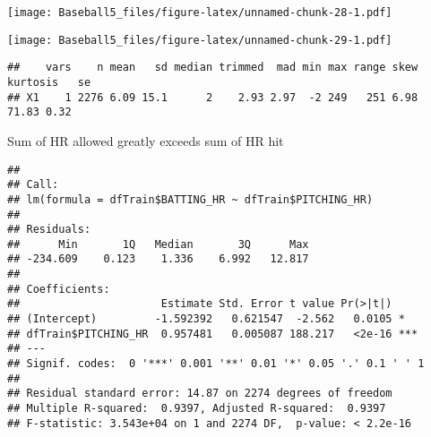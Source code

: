 \documentclass[
]{article}
\newenvironment{Shaded}{\begin{snugshade}}{\end{snugshade}}
\newcommand{\AttributeTok}[1]{\textcolor[rgb]{0.77,0.63,0.00}{#1}}
\newcommand{\DecValTok}[1]{\textcolor[rgb]{0.00,0.00,0.81}{#1}}
\newcommand{\FunctionTok}[1]{\textcolor[rgb]{0.00,0.00,0.00}{#1}}
\newcommand{\NormalTok}[1]{#1}
\newcommand{\OtherTok}[1]{\textcolor[rgb]{0.56,0.35,0.01}{#1}}
\newcommand{\SpecialCharTok}[1]{\textcolor[rgb]{0.00,0.00,0.00}{#1}}
\begin{document}
\texttt{[image: Baseball5\_files/figure-latex/unnamed-chunk-28-1.pdf]}

\begin{Shaded}
\end{Shaded}

\texttt{[image: Baseball5\_files/figure-latex/unnamed-chunk-29-1.pdf]}

\begin{Shaded}
\end{Shaded}

\begin{verbatim}
##    vars    n mean   sd median trimmed  mad min max range skew kurtosis   se
## X1    1 2276 6.09 15.1      2    2.93 2.97  -2 249   251 6.98    71.83 0.32
\end{verbatim}

Sum of HR allowed greatly exceeds sum of HR hit

\begin{Shaded}
\end{Shaded}

\begin{verbatim}
## 
## Call:
## lm(formula = dfTrain$BATTING_HR ~ dfTrain$PITCHING_HR)
## 
## Residuals:
##      Min       1Q   Median       3Q      Max 
## -234.609    0.123    1.336    6.992   12.817 
## 
## Coefficients:
##                      Estimate Std. Error t value Pr(>|t|)    
## (Intercept)         -1.592392   0.621547  -2.562   0.0105 *  
## dfTrain$PITCHING_HR  0.957481   0.005087 188.217   <2e-16 ***
## ---
## Signif. codes:  0 '***' 0.001 '**' 0.01 '*' 0.05 '.' 0.1 ' ' 1
## 
## Residual standard error: 14.87 on 2274 degrees of freedom
## Multiple R-squared:  0.9397, Adjusted R-squared:  0.9397 
## F-statistic: 3.543e+04 on 1 and 2274 DF,  p-value: < 2.2e-16
\end{verbatim}
\end{document}

